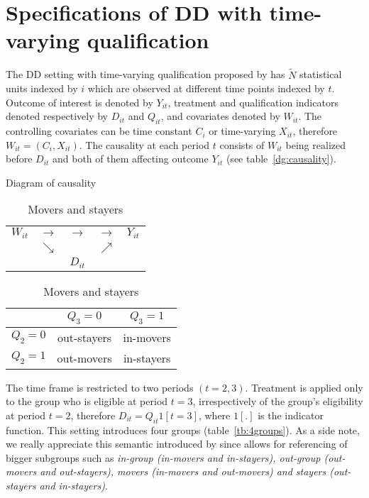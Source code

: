 \documentclass[12pt]{article}
\begin{document}
\section{Specifications of DD with time-varying qualification } \label{Sec:DD-set}

The DD setting with time-varying qualification proposed by \cite{lee2014difference} has $\tilde{N}$ statistical units indexed by $i$ which are observed at different time points indexed by $t$. Outcome of interest is denoted by $Y_{it}$, treatment and qualification indicators denoted respectively by $D_{it}$ and $Q_{it}$, and covariates denoted by $W_{it}$. The controlling covariates can be time constant $C_i$ or time-varying $X_{it}$, therefore $W_{it}=(C_i,X_{it})$. The causality at each period $t$ consists of $W_{it}$ being realized before $D_{it}$ and both of them affecting outcome $Y_{it}$ (see table~\vref{dg:causality}).

\begin{table}[h]
	\parbox{0.45\linewidth}{
		\centering
		\caption{Diagram of causality}
		\begin{tabular}{ccccc}
			$W_{it}$ & $\longrightarrow$ & $\longrightarrow$ & $\longrightarrow$ & $Y_{it}$ \\
			& $\searrow$ & & $\nearrow$ & \\
			& & $D_{it}$ & &
	\end{tabular}
	\label{dg:causality}
	}
	\parbox{0.45\linewidth}{
	\centering
	\caption{Movers and stayers}
	\begin{tabular}{l|cc}
		& $Q_3 = 0$ & $Q_3 = 1$ \\
		\hline
		$Q_2 = 0$ & out-stayers & in-movers \\
		$Q_2 = 1$ & out-movers & in-stayers \\		
	\end{tabular}
	\label{tb:4groups}
	}
\end{table}

The time frame is restricted to two periods $(t=2,3)$. Treatment is applied only to the group who is eligible at period $t=3$, irrespectively of the group's eligibility at period $t=2$, therefore $D_{it}=Q_{it}1[t=3]$, where $1[.]$ is the indicator function. This setting introduces four groups (table~\vref{tb:4groups}). As a side note, we really appreciate this semantic introduced by \cite{lee2014difference} since allows for referencing of bigger subgroups such as \textit{in-group (in-movers and in-stayers), out-group (out-movers and out-stayers), movers (in-movers and out-movers) and stayers (out-stayers and in-stayers)}.
 
\end{document}
